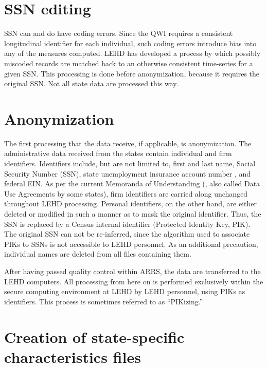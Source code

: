 \section{SSN editing}

SSN can and do have coding errors. Since the QWI requires
a consistent longitudinal identifier for each individual, such coding
errors introduce bias into any of the measures computed. LEHD has
developed a process by which possibly miscoded records are matched back to
an otherwise consistent time-series for a given SSN. This processing is
done before anonymization, because it requires the original SSN. Not all
state data are processed this way. 

\section{Anonymization}

The first processing that the data receive, if applicable, is anonymization. 
The administrative data received from the states contain individual and firm 
identifiers. Identifiers include, but are not limited to, first and last 
name, Social Security Number (SSN), state unemployment insurance account 
number , and federal EIN. As per the current Memoranda of Understanding (, 
also called Data Use Agreements%
 by some states), firm identifiers are 
carried along unchanged throughout LEHD processing. Personal identifiers, on 
the other hand, are either deleted or modified in such a manner as to mask 
the original identifier. Thus, the SSN is replaced by a Census internal 
identifier (Protected Identity Key, PIK). The original SSN can not be 
re-inferred, since the algorithm used to associate PIKs to SSNs is not 
accessible to LEHD personnel. As an additional precaution, individual names 
are deleted from all files containing them. 

After having passed quality control within ARRS, the data are transferred to 
the LEHD computers. All processing from here on is performed exclusively 
within the secure computing environment at LEHD by LEHD
personnel, using PIKs as identifiers. This process is sometimes referred to
as ``PIKizing.''


\section{Creation of state-specific characteristics files}

